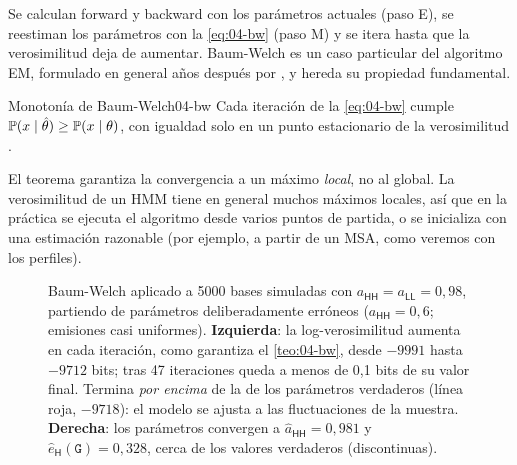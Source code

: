 Se calculan forward y backward con los parámetros actuales (paso E), se reestiman los parámetros con la \cref{eq:04-bw} (paso M) y se itera hasta que la verosimilitud deja de aumentar. Baum-Welch es un caso particular del algoritmo EM, formulado en general años después por \textcite{c04-dempster1977}, y hereda su propiedad fundamental.

\begin{teorema}{Monotonía de Baum-Welch}{04-bw}
Cada iteración de la \cref{eq:04-bw} cumple $\mathbb{P}(x\mid\hat\theta)\ge\mathbb{P}(x\mid\theta)$, con igualdad solo en un punto estacionario de la verosimilitud \parencite{c04-baum1970}.
\end{teorema}

\noindent El teorema garantiza la convergencia a un máximo \emph{local}, no al global. La verosimilitud de un HMM tiene en general muchos máximos locales, así que en la práctica se ejecuta el algoritmo desde varios puntos de partida, o se inicializa con una estimación razonable (por ejemplo, a partir de un MSA, como veremos con los perfiles).

\begin{figure}[tbp]
\centering
{}
\caption[Convergencia de Baum-Welch]{Baum-Welch aplicado a \num{5000} bases simuladas con $a_{\textsf{HH}}=a_{\textsf{LL}}=0{,}98$, partiendo de parámetros deliberadamente erróneos ($a_{\textsf{HH}}=0{,}6$; emisiones casi uniformes). \textbf{Izquierda}: la log-verosimilitud aumenta en cada iteración, como garantiza el \cref{teo:04-bw}, desde $-9991$ hasta $-9712$ bits; tras 47 iteraciones queda a menos de 0,1 bits de su valor final. Termina \emph{por encima} de la de los parámetros verdaderos (línea roja, $-9718$): el modelo se ajusta a las fluctuaciones de la muestra. \textbf{Derecha}: los parámetros convergen a $\hat a_{\textsf{HH}}=0{,}981$ y $\hat e_{\textsf{H}}(\texttt{G})=0{,}328$, cerca de los valores verdaderos (discontinuas).}
\label{fig:04-bw}
\end{figure}

